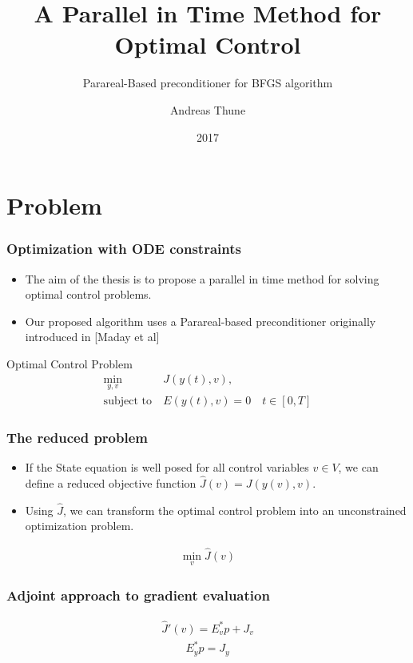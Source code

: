 \documentclass[9pt]{beamer}
\title{A Parallel in Time Method for Optimal Control}
\subtitle{Parareal-Based preconditioner for BFGS algorithm}
\author{Andreas Thune}
\date{2017}
\begin{document}
 
\frame{\titlepage}
\tableofcontents
\section{Problem}

\begin{frame}
\frametitle{Optimization with ODE constraints}
\begin{itemize}
\item{The aim of the thesis is to propose a parallel in time method for solving optimal control problems.}
\item{Our proposed algorithm uses a Parareal-based preconditioner originally introduced in [Maday et al] }
\end{itemize}
\begin{block}{Optimal Control Problem}
\begin{align*}
\min_{y,v} &J(y(t),v), \\
\textrm{subject to} \ &E(y(t),v)=0\quad t\in[0,T]
\end{align*}
\end{block}

\end{frame}
\begin{frame}

\frametitle{The reduced problem}
\begin{itemize}
\item{If the State equation is well posed for all control variables $v\in V$, we can define a reduced objective function $\hat{J}(v) = J(y(v),v)$.}
\item{Using $\hat J$, we can transform the optimal control problem into an unconstrained optimization problem.}
\end{itemize}
\begin{align*}
\min_v\hat J (v)
\end{align*}
\end{frame}
\begin{frame}
\frametitle{Adjoint approach to gradient evaluation}
\begin{align*}
\hat J'(v)=E_v^*p +J_v
\end{align*}
\begin{align*}
E_y^*p = J_y
\end{align*}
\end{frame}
\end{document}
